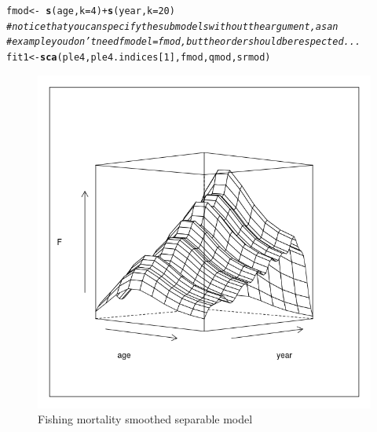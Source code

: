 \documentclass[a4paper,english,10pt]{article}\usepackage[]{graphicx}\usepackage[]{color}
\makeatletter
\def\maxwidth{ %
  \ifdim\Gin@nat@width>\linewidth
    \linewidth
  \else
    \Gin@nat@width
  \fi
}
\newcommand{\hlnum}[1]{\textcolor[rgb]{0.686,0.059,0.569}{#1}}%
\newcommand{\hlcom}[1]{\textcolor[rgb]{0.678,0.584,0.686}{\textit{#1}}}%
\newcommand{\hlopt}[1]{\textcolor[rgb]{0,0,0}{#1}}%
\newcommand{\hlstd}[1]{\textcolor[rgb]{0.345,0.345,0.345}{#1}}%
\newcommand{\hlkwb}[1]{\textcolor[rgb]{0.69,0.353,0.396}{#1}}%
\newcommand{\hlkwc}[1]{\textcolor[rgb]{0.333,0.667,0.333}{#1}}%
\newcommand{\hlkwd}[1]{\textcolor[rgb]{0.737,0.353,0.396}{\textbf{#1}}}%
\newenvironment{kframe}{%
 \def\at@end@of@kframe{}%
 \ifinner\ifhmode%
  \def\at@end@of@kframe{\end{minipage}}%
  \begin{minipage}{\columnwidth}%
 \fi\fi%
 \def\FrameCommand##1{\hskip\@totalleftmargin \hskip-\fboxsep
 \colorbox{shadecolor}{##1}\hskip-\fboxsep
     \hskip-\linewidth \hskip-\@totalleftmargin \hskip\columnwidth}%
 \MakeFramed {\advance\hsize-\width
   \@totalleftmargin\z@ \linewidth\hsize
   \@setminipage}}%
 {\par\unskip\endMakeFramed%
 \at@end@of@kframe}
\newenvironment{knitrout}{}{} %
\makeatother
\begin{document}
\begin{knitrout}
\color{fgcolor}\begin{kframe}
\begin{alltt}
\hlstd{fmod} \hlkwb{<-} \hlopt{~}\hlkwd{s}\hlstd{(age,} \hlkwc{k} \hlstd{=} \hlnum{4}\hlstd{)} \hlopt{+} \hlkwd{s}\hlstd{(year,} \hlkwc{k} \hlstd{=} \hlnum{20}\hlstd{)}
\hlcom{# notice that you can specify the submodels without the argument, as an}
\hlcom{# example you don't need fmodel=fmod, but the order should be respected...}
\hlstd{fit1} \hlkwb{<-} \hlkwd{sca}\hlstd{(ple4, ple4.indices[}\hlnum{1}\hlstd{], fmod, qmod, srmod)}
\end{alltt}
\end{kframe}
\end{knitrout}

\begin{knitrout}
\color{fgcolor}\begin{figure}[H]

{\centering \includegraphics[width=\maxwidth]{figure/sep2-1} 

}

\caption[Fishing mortality smoothed separable model]{Fishing mortality smoothed separable model}\label{fig:sep2}
\end{figure}


\end{knitrout}
\end{document}
